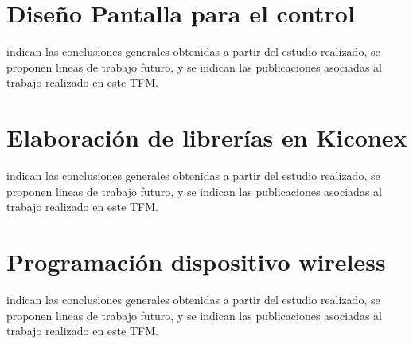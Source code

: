   


\section{Diseño Pantalla para el control}
\label{sec:programacionpantalla}
indican las conclusiones generales obtenidas a partir del estudio realizado, se proponen lineas de trabajo futuro, y se indican las publicaciones asociadas al trabajo realizado en este TFM.
\section{Elaboración de librerías en Kiconex}
\label{sec:librerias}
indican las conclusiones generales obtenidas a partir del estudio realizado, se proponen lineas de trabajo futuro, y se indican las publicaciones asociadas al trabajo realizado en este TFM.
\section{Programación dispositivo wireless}
\label{sec:programacionesp32}
indican las conclusiones generales obtenidas a partir del estudio realizado, se proponen lineas de trabajo futuro, y se indican las publicaciones asociadas al trabajo realizado en este TFM.